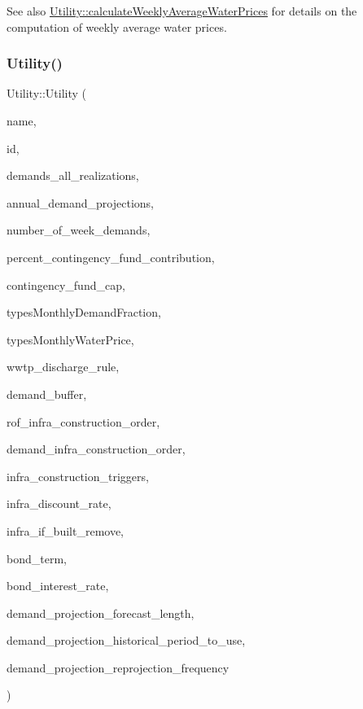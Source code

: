 \begin{DoxySeeAlso}{See also}
\mbox{\hyperlink{classUtility_a0189edb631c9596f094b15afeeb934fd}{Utility\+::calculate\+Weekly\+Average\+Water\+Prices}} for details on the computation of weekly average water prices. 
\end{DoxySeeAlso}
\mbox{\label{classUtility_aac7acd5b6fa457869763bbf3b83f870e}} 
\subsubsection{\texorpdfstring{Utility()}{Utility()}\hspace{0.1cm}{\footnotesize\ttfamily [2/4]}}
{\footnotesize\ttfamily Utility\+::\+Utility (\begin{DoxyParamCaption}\item[{const char $\ast$}]{name,  }\item[{int}]{id,  }\item[{vector$<$ vector$<$ double $>$$>$ \&}]{demands\+\_\+all\+\_\+realizations,  }\item[{vector$<$ double $>$ \&}]{annual\+\_\+demand\+\_\+projections,  }\item[{int}]{number\+\_\+of\+\_\+week\+\_\+demands,  }\item[{const double}]{percent\+\_\+contingency\+\_\+fund\+\_\+contribution,  }\item[{const double}]{contingency\+\_\+fund\+\_\+cap,  }\item[{const vector$<$ vector$<$ double $>$$>$ \&}]{types\+Monthly\+Demand\+Fraction,  }\item[{const vector$<$ vector$<$ double $>$$>$ \&}]{types\+Monthly\+Water\+Price,  }\item[{\mbox{\hyperlink{classWwtpDischargeRule}{Wwtp\+Discharge\+Rule}}}]{wwtp\+\_\+discharge\+\_\+rule,  }\item[{double}]{demand\+\_\+buffer,  }\item[{const vector$<$ int $>$ \&}]{rof\+\_\+infra\+\_\+construction\+\_\+order,  }\item[{const vector$<$ int $>$ \&}]{demand\+\_\+infra\+\_\+construction\+\_\+order,  }\item[{const vector$<$ double $>$ \&}]{infra\+\_\+construction\+\_\+triggers,  }\item[{double}]{infra\+\_\+discount\+\_\+rate,  }\item[{const vector$<$ vector$<$ int $>$$>$ \&}]{infra\+\_\+if\+\_\+built\+\_\+remove,  }\item[{double}]{bond\+\_\+term,  }\item[{double}]{bond\+\_\+interest\+\_\+rate,  }\item[{int}]{demand\+\_\+projection\+\_\+forecast\+\_\+length,  }\item[{int}]{demand\+\_\+projection\+\_\+historical\+\_\+period\+\_\+to\+\_\+use,  }\item[{int}]{demand\+\_\+projection\+\_\+reprojection\+\_\+frequency }\end{DoxyParamCaption})}



